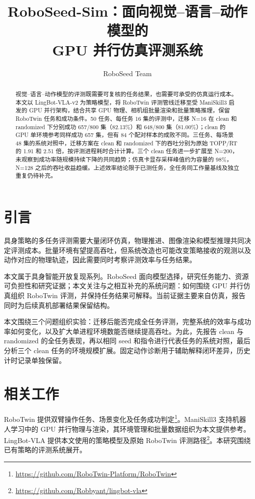 \documentclass{article}
\title{RoboSeed-Sim：面向视觉--语言--动作模型的\\GPU 并行仿真评测系统}
\author{RoboSeed Team}
\begin{document}
\setlength{\headheight}{38pt}
\maketitle
\begin{abstract}
视觉--语言--动作模型的评测既需要可复核的任务结果，也需要可承受的仿真运行成本。本文以 LingBot-VLA-v2 为策略模型，将 RoboTwin 评测管线迁移至受 ManiSkill3 启发的 GPU 并行架构，结合共享 GPU 物理、相机组批量渲染和批量策略推理，保留 RoboTwin 任务和成功条件。50 任务、每任务 16 集的评测中，迁移 N=16 在 clean 和 randomized 下分别成功 657/800 集（82.13\%）和 648/800 集（81.00\%）；clean 的 GPU 单环境参考同样成功 657 集，但有 84 个配对样本的成败不同。三任务、每场景 48 集的系统对照中，迁移方案在 clean 和 randomized 下的吞吐分别为原始 TOPP/RT 的 1.91 和 2.51 倍，按评测进程耗时合计计算。三个 clean 任务进一步扩展至 N=200，未观察到成功率随规模持续下降的共同趋势；仿真卡显存采样峰值约为容量的 98\%，N=128 之后的吞吐收益趋缓。上述效率结论限于已测任务，全任务同工作量基线及独立重复仍待补充。
\end{abstract}
\clearpage
\setlength{\headheight}{24pt}
\setcounter{tocdepth}{2}
\tableofcontents
\clearpage

\section{引言}
具身策略的多任务评测需要大量闭环仿真，物理推进、图像渲染和模型推理共同决定评测成本。批量环境有望提高吞吐，但系统改造也可能改变策略接收的观测以及动作对应的物理轨迹，因此需要同时考察评测效率与任务结果。

本文属于具身智能开放复现系列。RoboSeed 面向模型选择，研究任务能力、资源可负担性和研究证据\citep{roboseed}；本文关注与之相互补充的系统问题：如何围绕 GPU 并行仿真组织 RoboTwin 评测，并保持任务结果可解释。当前证据主要来自仿真，报告同时为后续真机部署结果保留结构。

本文围绕三个问题组织实验：迁移后能否完成全任务评测，完整系统的效率与成功率如何变化，以及扩大单进程环境数能否继续提高吞吐。为此，先报告 clean 与 randomized 的全任务表现，再以相同 seed 和指令进行代表任务的系统对照，最后分析三个 clean 任务的环境规模扩展。固定动作诊断用于辅助解释闭环差异，历史计时记录单独保留。

\section{相关工作}
RoboTwin 提供双臂操作任务、场景变化及任务成功判定\footnote{\url{https://github.com/RoboTwin-Platform/RoboTwin}}。ManiSkill3 支持机器人学习中的 GPU 并行物理与渲染，其环境管理和批量数据组织为本文提供参考\citep{maniskill3}。LingBot-VLA 提供本文使用的策略模型及原始 RoboTwin 评测路径\footnote{\url{https://github.com/Robbyant/lingbot-vla}}。本研究围绕已有策略的评测系统展开。
\end{document}
